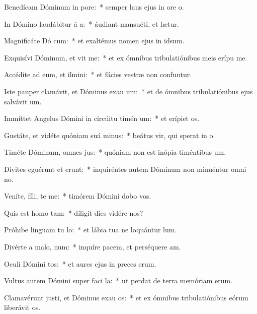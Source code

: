 \item Benedícam Dóminum in  pore:~* semper laus ejus in ore o.
\item In Dómino laudábitur á a:~* áudiant mansuéti, et lætur.
\item Magnificáte Dó cum:~* et exaltémus nomen ejus in idsum.
\item Exquisívi Dóminum, et vit me:~* et ex ómnibus tribulatiónibus meis erípu me.
\item Accédite ad eum, et ilmini:~* et fácies vestræ non confuntur.
\item Iste pauper clamávit, et Dóminus exau um:~* et de ómnibus tribulatiónibus ejus salvávit um.
\item Immíttet Angelus Dómini in circúitu timén um:~* et erípiet os.
\item Gustáte, et vidéte quóniam suá  minus:~* beátus vir, qui sperat in o.
\item Timéte Dóminum, omnes  jus:~* quóniam non est inópia timéntibus um.
\item Dívites eguérunt et erunt:~* inquiréntes autem Dóminum non minuéntur omni no.
\item Veníte, fíli, te me:~* timórem Dómini dobo vos.
\item Quis est homo   tam:~* díligit dies vidére nos?
\item Próhibe linguam tu  lo:~* et lábia tua ne loquántur lum.
\item Divérte a malo,   num:~* inquíre pacem, et perséquere am.
\item Oculi Dómini  tos:~* et aures ejus in preces erum.
\item Vultus autem Dómini super faci la:~* ut perdat de terra memóriam erum.
\item Clamavérunt justi, et Dóminus exau os:~* et ex ómnibus tribulatiónibus eórum liberávit os.
